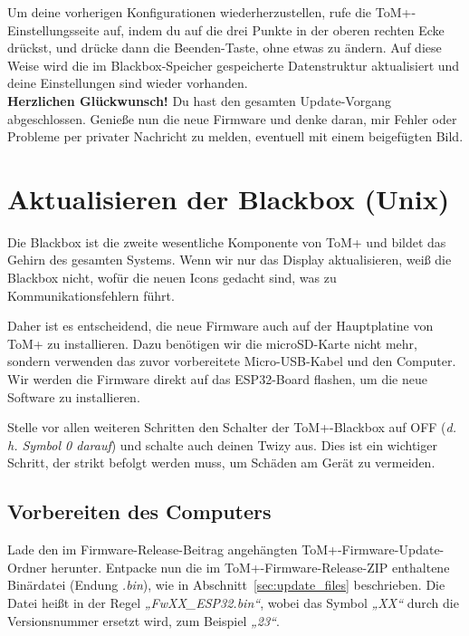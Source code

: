 Um deine vorherigen Konfigurationen wiederherzustellen, rufe die ToM+-Einstellungsseite auf, indem du auf die drei Punkte in der oberen rechten Ecke drückst, und drücke dann die Beenden-Taste, ohne etwas zu ändern. Auf diese Weise wird die im Blackbox-Speicher gespeicherte Datenstruktur aktualisiert und deine Einstellungen sind wieder vorhanden.\\

\textbf{Herzlichen Glückwunsch!} Du hast den gesamten Update-Vorgang abgeschlossen. Genieße nun die neue Firmware und denke daran, mir Fehler oder Probleme per privater Nachricht zu melden, eventuell mit einem beigefügten Bild.


\clearpage

\section{Aktualisieren der Blackbox (Unix)}

Die Blackbox ist die zweite wesentliche Komponente von ToM+ und bildet das Gehirn des gesamten Systems. Wenn wir nur das Display aktualisieren, weiß die Blackbox nicht, wofür die neuen Icons gedacht sind, was zu Kommunikationsfehlern führt.

Daher ist es entscheidend, die neue Firmware auch auf der Hauptplatine von ToM+ zu installieren. Dazu benötigen wir die microSD-Karte nicht mehr, sondern verwenden das zuvor vorbereitete Micro-USB-Kabel und den Computer. Wir werden die Firmware direkt auf das ESP32-Board flashen, um die neue Software zu installieren.

Stelle vor allen weiteren Schritten den Schalter der ToM+-Blackbox auf OFF (\textit{d.\,h. Symbol 0 darauf}) und schalte auch deinen Twizy aus. Dies ist ein wichtiger Schritt, der strikt befolgt werden muss, um Schäden am Gerät zu vermeiden.

\subsection{Vorbereiten des Computers}

Lade den im Firmware-Release-Beitrag angehängten ToM+-Firmware-Update-Ordner herunter. Entpacke nun die im ToM+-Firmware-Release-ZIP enthaltene Binärdatei (Endung \textit{.bin}), wie in Abschnitt~\ref{sec:update_files} beschrieben. Die Datei heißt in der Regel \textit{„FwXX\_ESP32.bin“}, wobei das Symbol \textit{„XX“} durch die Versionsnummer ersetzt wird, zum Beispiel \textit{„23“}.\\

